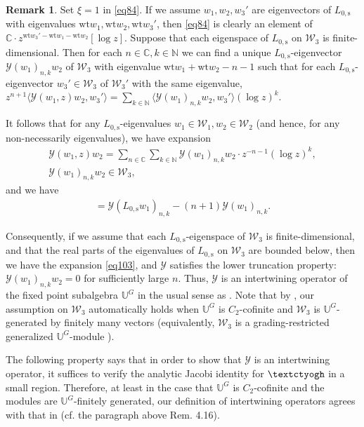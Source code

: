 \documentclass[11pt,b5paper,notitlepage]{article}
\theoremstyle{definition}
\newtheorem{rem}[df]{Remark}
\theoremstyle{plain}
\newcommand{\mc}{\mathcal}
\newcommand{\bk}[1]{\langle {#1}\rangle}
\newcommand{\Ubb}{\mathbb U}
\newcommand{\Cbb}{\mathbb C}
\newcommand{\Nbb}{\mathbb N}
\newcommand{\wt}{\mathrm{wt}}
\newcommand{\Lss}{{L_{0,\mathrm{s}}}}
\newcommand{\tipaz}{\text{\textctyogh}}
\numberwithin{equation}{subsection}
\begin{document}
\begin{rem}
Set $\xi=1$ in \eqref{eq84}. If we assume $w_1,w_2,w_3'$ are eigenvectors of $\Lss$ with eigenvalues $\wt w_1,\wt w_2,\wt w_3'$, then \eqref{eq84} is clearly an element of $\Cbb\cdot z^{\wt w_3'-\wt w_1-\wt w_2}[\log z]$. Suppose that each eigenspace of $\Lss$ on $\mc W_3$ is finite-dimensional. Then for each $n\in\Cbb, k\in\Nbb$ we can find a unique $\Lss$-eigenvector $\mc Y(w_1)_{n,k}w_2$ of $\mc W_3$ with eigenvalue $\wt w_1+\wt w_2-n-1$ such that for each $\Lss$-eigenvector $w_3'\in\mc W_3$ of $\mc W_3'$ with the same eigenvalue, $z^{n+1}\bk{\mc Y(w_1,z)w_2,w_3'}=\sum_{k\in\Nbb}\bk{\mc Y(w_1)_{n,k}w_2,w_3'}(\log z)^k$. 

It follows that for any $\Lss$-eigenvalues $w_1\in\mc W_1,w_2\in\mc W_2$ (and hence, for any non-necessarily eigenvalues), we have expansion
\begin{gather}
	\mc Y(w_1,z)w_2=\sum_{n\in\Cbb}\sum_{k\in\Nbb}\mc Y(w_1)_{n,k}w_2\cdot z^{-n-1}(\log z)^k,\nonumber\\	
\mc Y(w_1)_{n,k}w_2\in\mc W_3,	\label{eq103}
\end{gather}
and we have
\begin{align}
[\Lss,\mc Y(w_1)_{n,k}]=\mc Y(\Lss w_1)_{n,k}-(n+1)\mc Y(w_1)_{n,k}.	
\end{align}

Consequently,  if we assume that each $\Lss$-eigenspace of $\mc W_3$ is finite-dimensional, and that the real parts of the eigenvalues of $\Lss$ on $\mc W_3$ are bounded below, then we have the expansion \eqref{eq103}, and $\mc Y$ satisfies the lower truncation property: $\mc Y(w_1)_{n,k}w_2=0$ for sufficiently large $n$. Thus, $\mc Y$ is an intertwining operator of the fixed point subalgebra $\Ubb^G$ in the usual sense as \cite{HLZ10}. Note that by \cite[Lemma 2.4]{Miy04}, our assumption on $\mc W_3$ automatically holds when $\Ubb^G$ is $C_2$-cofinite and $\mc W_3$ is $\Ubb^G$-generated by finitely many vectors (equivalently, $\mc W_3$ is a grading-restricted generalized $\Ubb^G$-module \cite[Cor. 3.16]{Hua09}).
\end{rem}






The following property says that in order to show that $\mc Y$ is an intertwining operator, it suffices to verify the analytic Jacobi identity for  $\tipaz$ in a small region. Therefore, at least in the case that $\Ubb^G$ is $C_2$-cofinite and the modules are $\Ubb^G$-finitely generated, our definition of intertwining operators agrees with that in \cite{McR21} (cf. the paragraph above Rem. 4.16).
\end{document}
